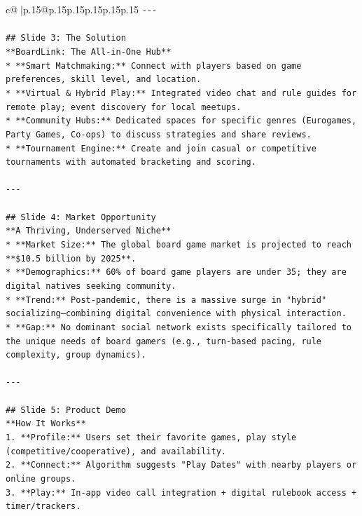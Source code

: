 \documentclass{article}
\begin{document}
{\begin{supertabular}{c@{$\;$}|p{.15\linewidth}@{}p{.15\linewidth}p{.15\linewidth}p{.15\linewidth}p{.15\linewidth}p{.15\linewidth}}
{{{\texttt{{-}{-}{-}} \\
\\ 
\texttt{\#\# Slide 3: The Solution} \\
\texttt{**BoardLink: The All{-}in{-}One Hub**} \\
\texttt{*   **Smart Matchmaking:** Connect with players based on game preferences, skill level, and location.} \\
\texttt{*   **Virtual \& Hybrid Play:** Integrated video chat and rule guides for remote play; event discovery for local meetups.} \\
\texttt{*   **Community Hubs:** Dedicated spaces for specific genres (Eurogames, Party Games, Co{-}ops) to discuss strategies and share reviews.} \\
\texttt{*   **Tournament Engine:** Create and join casual or competitive tournaments with automated bracketing and scoring.} \\
\\ 
\texttt{{-}{-}{-}} \\
\\ 
\texttt{\#\# Slide 4: Market Opportunity} \\
\texttt{**A Thriving, Underserved Niche**} \\
\texttt{*   **Market Size:** The global board game market is projected to reach **\$10.5 billion by 2025**.} \\
\texttt{*   **Demographics:** 60\% of board game players are under 35; they are digital natives seeking community.} \\
\texttt{*   **Trend:** Post{-}pandemic, there is a massive surge in "hybrid" socializing—combining digital convenience with physical interaction.} \\
\texttt{*   **Gap:** No dominant social network exists specifically tailored to the unique needs of board gamers (e.g., turn{-}based pacing, rule complexity, group dynamics).} \\
\\ 
\texttt{{-}{-}{-}} \\
\\ 
\texttt{\#\# Slide 5: Product Demo} \\
\texttt{**How It Works**} \\
\texttt{1.  **Profile:** Users set their favorite games, play style (competitive/cooperative), and availability.} \\
\texttt{2.  **Connect:** Algorithm suggests "Play Dates" with nearby players or online groups.} \\
\texttt{3.  **Play:** In{-}app video call integration + digital rulebook access + timer/trackers.} \\
}}}
\end{supertabular}}
\end{document}
